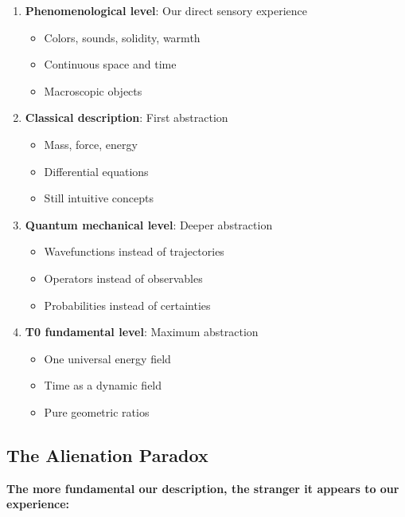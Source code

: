 	\begin{tcolorbox}[colback=orange!5!white,colframe=orange!75!black,title=Ontological Stratification of Reality]
		\begin{enumerate}
			\item \textbf{Phenomenological level}: Our direct sensory experience
			\begin{itemize}
				\item Colors, sounds, solidity, warmth
				\item Continuous space and time
				\item Macroscopic objects
			\end{itemize}
			
			\item \textbf{Classical description}: First abstraction
			\begin{itemize}
				\item Mass, force, energy
				\item Differential equations
				\item Still intuitive concepts
			\end{itemize}
			
			\item \textbf{Quantum mechanical level}: Deeper abstraction
			\begin{itemize}
				\item Wavefunctions instead of trajectories
				\item Operators instead of observables
				\item Probabilities instead of certainties
			\end{itemize}
			
			\item \textbf{T0 fundamental level}: Maximum abstraction
			\begin{itemize}
				\item One universal energy field
				\item Time as a dynamic field
				\item Pure geometric ratios
			\end{itemize}
		\end{enumerate}
	\end{tcolorbox}
	
	\subsection{The Alienation Paradox}
	
	\textbf{The more fundamental our description, the stranger it appears to our experience:}
	
